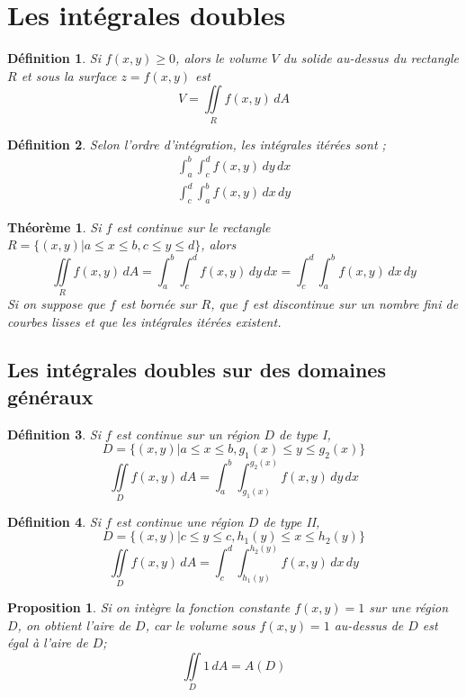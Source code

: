 \documentclass{article}[babel]
\newtheorem{mydef}{Définition}
\newtheorem{myprop}{Proposition}
\newtheorem{mythm}{Théorème}
\begin{document}
\section{Les intégrales doubles}
	\begin{mydef}
	Si $f(x,y)\geq 0$, alors le volume $V$ du solide au-dessus du rectangle $R$ et sous la surface $z=f(x,y)$ est \[V=\iint\limits_R f(x,y)\, dA\]
\end{mydef}
	\begin{mydef}
		Selon l'ordre d'intégration, les intégrales itérées sont ;
		\begin{gather}
			\int_a^b\int_c^d f(x,y)\, dy\, dx\\
			\int_c^d\int_a^b f(x,y)\, dx\, dy
		\end{gather}
	\end{mydef}
	\begin{mythm}
		Si $f$ est continue sur le rectangle $R=\big\{(x,y) \lvert a\leq x \leq b, c\leq y \leq d  \big\}$, alors 
			\[\iint\limits_R f(x,y)\, dA=\int_a^b\int_c^d f(x,y)\, dy\, dx=	\int_c^d\int_a^b f(x,y)\, dx\, dy\]
		Si on suppose que $f$ est bornée sur $R$, que $f$ est discontinue sur un nombre fini de courbes lisses et que les intégrales itérées existent.
	\end{mythm}
	\subsection{Les intégrales doubles sur des domaines généraux}
		\begin{mydef}
			Si $f$ est continue sur un région $D$ de type I,
				\[D=\big\{(x,y)\lvert a\leq x\leq b, g_1(x)\leq y\leq g_2(x)\big\}\]
				\[\iint\limits_D f(x,y)\, dA = \int_a^b\int_{g_1(x)}^{g_2(x)} f(x,y)\, dy\, dx\]
		\end{mydef}
		\begin{mydef}
			Si $f$ est continue une région $D$ de type II,
				\[D=\big\{(x,y)\lvert c\leq y\leq c, h_1(y)\leq x\leq h_2(y)\big\}\]
			\[\iint\limits_D f(x,y)\, dA = \int_c^d\int_{h_1(y)}^{h_2(y)} f(x,y)\, dx\, dy\]
		\end{mydef}
		\begin{myprop}
		Si on intègre la fonction constante $f(x,y)=1$ sur une région $D$, on obtient l'aire de $D$, car le volume sous $f(x,y)=1$ au-dessus de $D$ est égal à l'aire de $D$;\[\iint\limits_D 1\, dA=A(D)\]
	\end{myprop}
\end{document}
